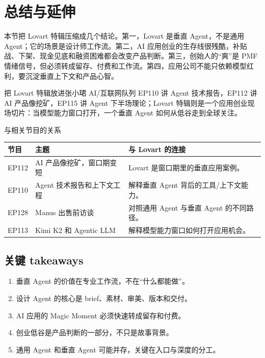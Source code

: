 \section{总结与延伸}

本节把 Lovart 特辑压缩成几个结论。第一，Lovart 是垂直 Agent，不是通用 Agent；它的场景是设计师工作流。第二，AI 应用创业的生存线很残酷，补贴战、下架、现金见底和融资困难都会改变产品判断。第三，创始人的“爽”是 PMF 情绪信号，但必须转成留存、付费和工作流。第四，应用公司不能只依赖模型红利，要沉淀垂直上下文和产品心智。

\begin{importantbox}{把 Lovart 特辑放进张小珺 AI/互联网队列}
EP110 讲 Agent 技术报告，EP112 讲 AI 产品像挖矿，EP115 讲 Agent 下半场理论；Lovart 特辑则是一个应用创业现场切片：当模型能力窗口打开，一个垂直 Agent 如何从低谷走到全球关注。
\end{importantbox}

\begin{knowledgebox}{与相关节目的关系}
\begin{tabularx}{\textwidth}{p{}p{}X}
\toprule
节目 & 主题 & 与 Lovart 的连接 \\
\midrule
EP112 & AI 产品像挖矿，窗口期变短 & Lovart 是窗口期里的垂直应用案例。 \\
EP110 & Agent 技术报告和上下文工程 & 解释垂直 Agent 背后的工具/上下文能力。 \\
EP128 & Manus 出售前访谈 & 对照通用 Agent 与垂直 Agent 的不同路径。 \\
EP113 & Kimi K2 和 Agentic LLM & 解释模型能力窗口如何打开应用机会。 \\
\bottomrule
\end{tabularx}
\end{knowledgebox}

\subsection{关键 takeaways}

\begin{enumerate}
\item 垂直 Agent 的价值在专业工作流，不在“什么都能做”。
\item 设计 Agent 的核心是 brief、素材、审美、版本和交付。
\item AI 应用的 Magic Moment 必须快速转成留存和付费。
\item 创业低谷是产品判断的一部分，不只是故事背景。
\item 通用 Agent 和垂直 Agent 可能并存，关键在入口与深度的分工。
\end{enumerate}

